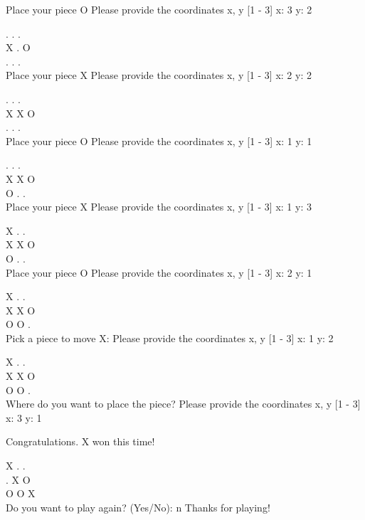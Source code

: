 \documentclass[]{article}
\begin{document}
{Place your piece O
Please provide the coordinates x, y [1 - 3]
x: 3
y: 2


. . . \\
X . O\\ 
. . . \\


Place your piece X
Please provide the coordinates x, y [1 - 3]
x: 2
y: 2


. . . \\
X X O\\ 
. . . \\


Place your piece O
Please provide the coordinates x, y [1 - 3]
x: 1
y: 1

. . . \\
X X O \\
O . . \\


Place your piece X
Please provide the coordinates x, y [1 - 3]
x: 1
y: 3

X . . \\
X X O \\
O . . \\

Place your piece O
Please provide the coordinates x, y [1 - 3]
x: 2
y: 1

X . . \\
X X O \\
O O . \\

Pick a piece to move X:
Please provide the coordinates x, y [1 - 3]
x: 1
y: 2

X . . \\
X X O \\
O O . \\

Where do you want to place the piece?
Please provide the coordinates x, y [1 - 3]
x: 3
y: 1

Congratulations. X won this time!

X . . \\
. X O \\
O O X \\

Do you want to play again? (Yes/No): n
Thanks for playing!
}
\end{document}
